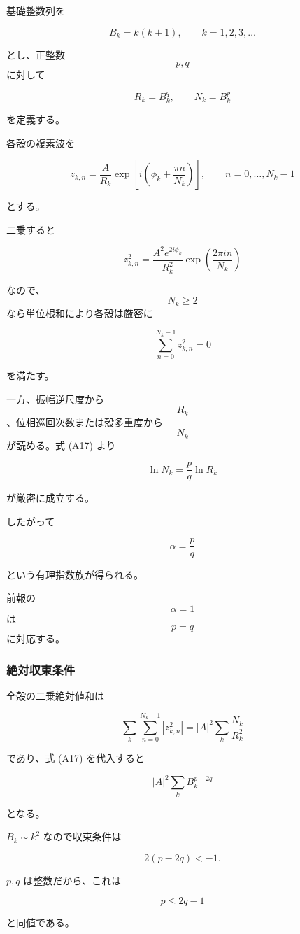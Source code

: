 \documentclass[
  a4paper,
]{ltjsarticle}
\begin{document}
基礎整数列を

\[
B_k=k(k+1),
\qquad
k=1,2,3,\ldots
\tag{A16}
\]

とし、正整数 \[p,q\] に対して

\[
R_k=B_k^q,
\qquad
N_k=B_k^p
\tag{A17}
\]

を定義する。

各殻の複素波を

\[
\boxed{
z_{k,n}
=
\frac{A}{R_k}
\exp\left[
i\left(
\phi_k+
\frac{\pi n}{N_k}
\right)
\right],
\qquad
n=0,\ldots,N_k-1
}
\tag{A18}
\]

とする。

二乗すると

\[
z_{k,n}^2
=
\frac{A^2e^{2i\phi_k}}{R_k^2}
\exp\left(
\frac{2\pi i n}{N_k}
\right)
\]

なので、\[N_k\ge2\] なら単位根和により各殻は厳密に

\[
\boxed{
\sum_{n=0}^{N_k-1}z_{k,n}^2=0
}
\tag{A19}
\]

を満たす。

一方、振幅逆尺度から \[R_k\]、位相巡回次数または殻多重度から \[N_k\]
が読める。式 (A17) より

\[
\ln N_k
=
\frac{p}{q}
\ln R_k
\tag{A20}
\]

が厳密に成立する。

したがって

\[
\boxed{
\alpha=\frac{p}{q}
}
\tag{A21}
\]

という有理指数族が得られる。

前報の \[\alpha=1\] は \[p=q\] に対応する。

\subsubsection{絶対収束条件}\label{ux7d76ux5bfeux53ceux675fux6761ux4ef6}

全殻の二乗絶対値和は

\[
\sum_k\sum_{n=0}^{N_k-1}|z_{k,n}^2|
=
|A|^2
\sum_k
\frac{N_k}{R_k^2}
\]

であり、式 (A17) を代入すると

\[
|A|^2
\sum_k
B_k^{p-2q}
\tag{A22}
\]

となる。

\(B_k\sim k^2\) なので収束条件は

\[
2(p-2q)<-1.
\]

\(p,q\) は整数だから、これは

\[
\boxed{
p\le2q-1
}
\tag{A23}
\]

と同値である。
\end{document}
